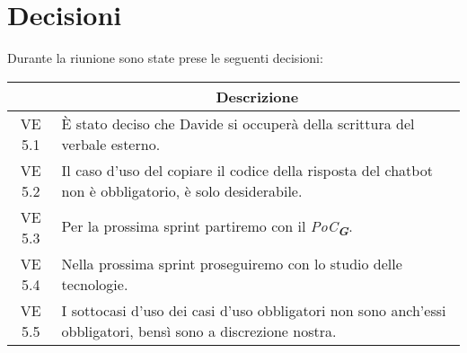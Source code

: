 

\section{Decisioni}

Durante la riunione sono state prese le seguenti decisioni:

\vspace{0.5cm}

\begin{table}[htbp]
    \centering
    \begin{tabular}{|c|p{}|}
        \hline
        \rowcolor[gray]{0.75}
        \multicolumn{1}{|c|}{\textbf{Codice}} & \multicolumn{1}{|c|}{\textbf{Descrizione}}\\
        \hline
        VE 5.1 & È stato deciso che Davide si occuperà della scrittura del verbale esterno. \\
        VE 5.2 & Il caso d'uso del copiare il codice della risposta del chatbot non è obbligatorio, è solo desiderabile. \\
        VE 5.3 & Per la prossima sprint partiremo con il \emph{PoC}\textsubscript{\textbf{\textit{G}}}. \\
        VE 5.4 & Nella prossima sprint proseguiremo con lo studio delle tecnologie. \\
        VE 5.5 & I sottocasi d'uso dei casi d'uso obbligatori non sono anch'essi obbligatori, bensì sono a discrezione nostra. \\
        \hline
    \end{tabular}
\end{table}